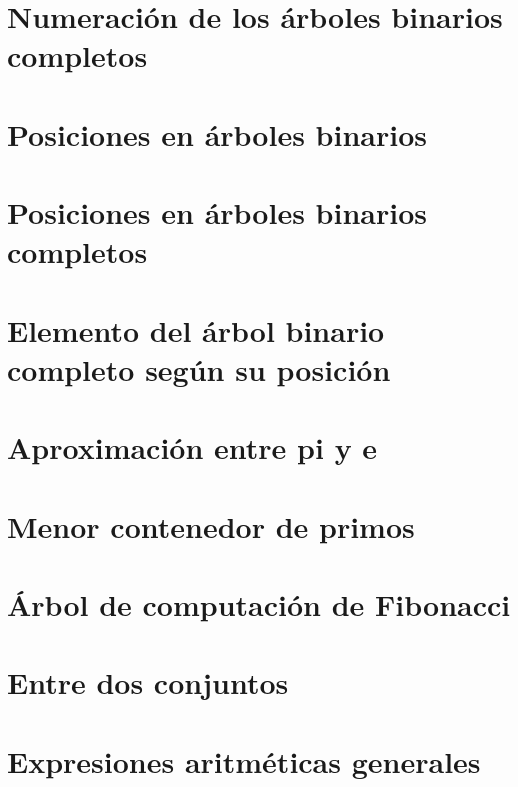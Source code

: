 \documentclass[a4paper,12pt,twoside]{book}
\begin{document}
\chapter{Numeración de los árboles binarios completos}
\label{031218}

\chapter{Posiciones en árboles binarios}
\label{041218}

\chapter{Posiciones en árboles binarios completos}
\label{051218}

\chapter{Elemento del árbol binario completo según su
  posición}
\label{061218}

\chapter{Aproximación entre pi y e}
\label{071218}


\chapter{Menor contenedor de primos}
\label{101218}

\chapter{Árbol de computación de Fibonacci}
\label{111218}

\chapter{Entre dos conjuntos}
\label{121218}

\chapter{Expresiones aritméticas generales}
\label{131218}
\end{document}
